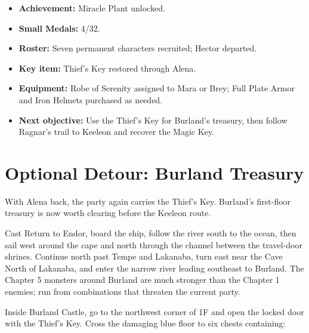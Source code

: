 \documentclass[
  american,
  10pt,
  letterpaper,
  oneside,
  open=any]{scrreprt}
\providecommand{\tightlist}{%
  \setlength{\itemsep}{0pt}\setlength{\parskip}{0pt}}
\begin{document}
\begin{itemize}
\tightlist
\item
  \textbf{Achievement:} Miracle Plant unlocked.
\item
  \textbf{Small Medals:} 4/32.
\item
  \textbf{Roster:} Seven permanent characters recruited; Hector
  departed.
\item
  \textbf{Key item:} Thief's Key restored through Alena.
\item
  \textbf{Equipment:} Robe of Serenity assigned to Mara or Brey; Full
  Plate Armor and Iron Helmets purchased as needed.
\item
  \textbf{Next objective:} Use the Thief's Key for Burland's treasury,
  then follow Ragnar's trail to Keeleon and recover the Magic Key.
\end{itemize}

\section{Optional Detour: Burland
Treasury}\label{optional-detour-burland-treasury}

With Alena back, the party again carries the Thief's Key. Burland's
first-floor treasury is now worth clearing before the Keeleon route.

Cast Return to Endor, board the ship, follow the river south to the
ocean, then sail west around the cape and north through the channel
between the travel-door shrines. Continue north past Tempe and Lakanaba,
turn east near the Cave North of Lakanaba, and enter the narrow river
leading southeast to Burland. The Chapter 5 monsters around Burland are
much stronger than the Chapter 1 enemies; run from combinations that
threaten the current party.

Inside Burland Castle, go to the northwest corner of 1F and open the
locked door with the Thief's Key. Cross the damaging blue floor to six
chests containing:
\end{document}
